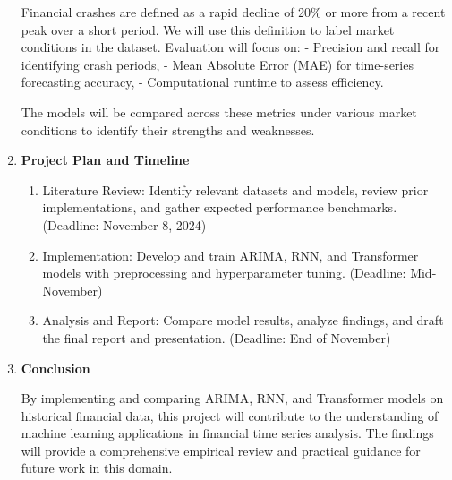 \documentclass[12pt, letterpaper]{article}
\begin{document}
\begin{enumerate}[label=]
        Financial crashes are defined as a rapid decline of 20\% or more from a recent peak over a short period. We will use this definition to label market conditions in the dataset. Evaluation will focus on:
        - Precision and recall for identifying crash periods,
        - Mean Absolute Error (MAE) for time-series forecasting accuracy,
        - Computational runtime to assess efficiency.

        The models will be compared across these metrics under various market conditions to identify their strengths and weaknesses.

    \item \textbf{Project Plan and Timeline}
    
        \begin{enumerate}[label=-]
            \item Literature Review: Identify relevant datasets and models, review prior implementations, and gather expected performance benchmarks. (Deadline: November 8, 2024)
            \item Implementation: Develop and train ARIMA, RNN, and Transformer models with preprocessing and hyperparameter tuning. (Deadline: Mid-November)
            \item Analysis and Report: Compare model results, analyze findings, and draft the final report and presentation. (Deadline: End of November)
        \end{enumerate}
        

    
    \item \textbf{Conclusion}

    By implementing and comparing ARIMA, RNN, and Transformer models on historical financial data, this project will contribute to the understanding of machine learning applications in financial time series analysis. The findings will provide a comprehensive empirical review and practical guidance for future work in this domain.

\end{enumerate}
\end{document}
